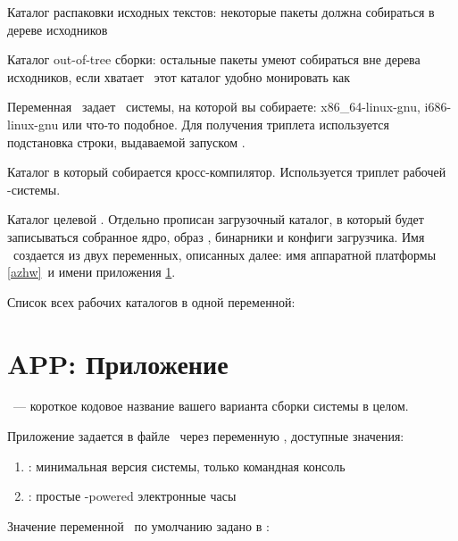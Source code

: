 
Каталог распаковки исходных текстов: некоторые пакеты должна собираться в дереве
исходников


Каталог out-of-tree сборки: остальные пакеты умеют собираться вне дерева
исходников, если хватает \ram\ этот каталог удобно монировать как 


Переменная \ задает \ системы, на которой вы
собираете: x86\_64-linux-gnu, i686-linux-gnu или что-то подобное. Для получения
триплета используется подстановка строки, выдаваемой запуском .


Каталог в который собирается кросс-компилятор. Используется триплет
рабочей \linux-системы.


Каталог целевой . Отдельно прописан загрузочный каталог, в который
будет записываться собранное ядро, образ , бинарники и конфиги
загрузчика. Имя \ создается из двух переменных, описанных далее: имя
аппаратной платформы \ref{azhw}\ и имени приложения
\ref{azapp}.


Список всех рабочих каталогов в одной переменной:


\section{APP: Приложение}\label{azapp}

\ --- короткое кодовое название вашего варианта сборки системы
в целом.

Приложение задается в файле \ через
переменную , доступные значения:

\begin{enumerate}
  \item {}: минимальная версия системы, только командная консоль
  \item {}: простые \linux-powered электронные часы
\end{enumerate}

Значение переменной \ по умолчанию задано в :

